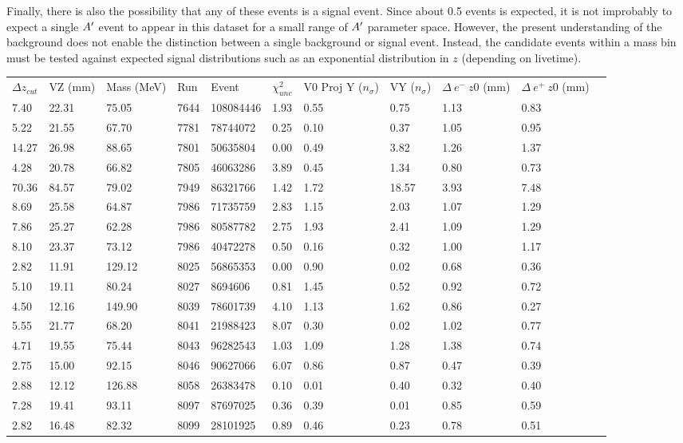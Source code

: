Finally, there is also the possibility that any of these events is a signal event. Since about 0.5 events is expected, it is not improbably to expect a single $A^\prime$ event to appear in this dataset for a small range of $A^\prime$ parameter space. However, the present understanding of the background does not enable the distinction between a single background or signal event. Instead, the candidate events within a mass bin must be tested against expected signal distributions such as an exponential distribution in $z$ (depending on livetime). 

\begin{table}[t]
\centering
\tabcolsep=0.09cm
\begin{tabular}{lllllllllll}

\hline

$\Delta z_{cut}$ & VZ (mm) & Mass (MeV) & Run & Event & $\chi^2_{unc}$ & V0 Proj Y ($n_{\sigma}$) & VY ($n_{\sigma}$) & $\Delta \ e^- \ z0$ (mm) & $\Delta \ e^+ \ z0$ (mm) \\
7.40 & 22.31 & 75.05 & 7644 & 108084446 & 1.93 & 0.55 & 0.75 & 1.13 & 0.83 \\ 
5.22 & 21.55 & 67.70 & 7781 & 78744072 & 0.25 & 0.10 & 0.37 & 1.05 & 0.95 \\ 
14.27 & 26.98 & 88.65 & 7801 & 50635804 & 0.00 & 0.49 & 3.82 & 1.26 & 1.37 \\ 
4.28 & 20.78 & 66.82 & 7805 & 46063286 & 3.89 & 0.45 & 1.34 & 0.80 & 0.73 \\ 
70.36 & 84.57 & 79.02 & 7949 & 86321766 & 1.42 & 1.72 & 18.57 & 3.93 & 7.48 \\ 
8.69 & 25.58 & 64.87 & 7986 & 71735759 & 2.83 & 1.15 & 2.03 & 1.07 & 1.29 \\ 
7.86 & 25.27 & 62.28 & 7986 & 80587782 & 2.75 & 1.93 & 2.41 & 1.09 & 1.29 \\ 
8.10 & 23.37 & 73.12 & 7986 & 40472278 & 0.50 & 0.16 & 0.32 & 1.00 & 1.17 \\ 
2.82 & 11.91 & 129.12 & 8025 & 56865353 & 0.00 & 0.90 & 0.02 & 0.68 & 0.36 \\ 
5.10 & 19.11 & 80.24 & 8027 & 8694606 & 0.81 & 1.45 & 0.52 & 0.92 & 0.72 \\ 
4.50 & 12.16 & 149.90 & 8039 & 78601739 & 4.10 & 1.13 & 1.62 & 0.86 & 0.27 \\ 
5.55 & 21.77 & 68.20 & 8041 & 21988423 & 8.07 & 0.30 & 0.02 & 1.02 & 0.77 \\ 
4.71 & 19.55 & 75.44 & 8043 & 96282543 & 1.03 & 1.09 & 1.28 & 1.38 & 0.74 \\ 
2.75 & 15.00 & 92.15 & 8046 & 90627066 & 6.07 & 0.86 & 0.87 & 0.47 & 0.39 \\ 
2.88 & 12.12 & 126.88 & 8058 & 26383478 & 0.10 & 0.01 & 0.40 & 0.32 & 0.40 \\ 
7.28 & 19.41 & 93.11 & 8097 & 87697025 & 0.36 & 0.39 & 0.01 & 0.85 & 0.59 \\ 
2.82 & 16.48 & 82.32 & 8099 & 28101925 & 0.89 & 0.46 & 0.23 & 0.78 & 0.51 \\


\end{tabular}
\end{table}
